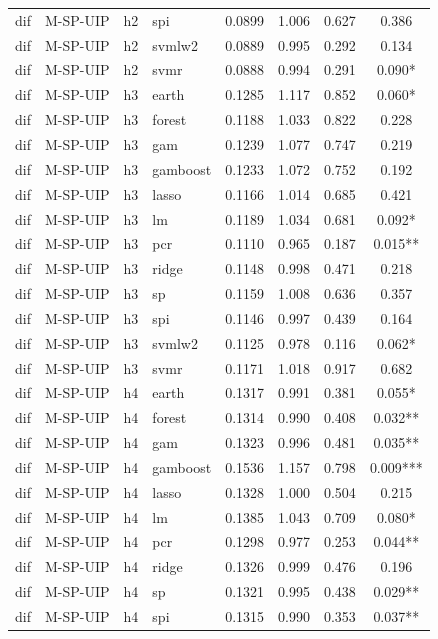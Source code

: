 \begin{ThreePartTable}
\begin{longtable}[t]{llclcccc}
dif & M-SP-UIP & h2 & spi & 0.0899 & 1.006 & 0.627 & 0.386\\
dif & M-SP-UIP & h2 & svmlw2 & 0.0889 & 0.995 & 0.292 & 0.134\\
dif & M-SP-UIP & h2 & svmr & 0.0888 & 0.994 & 0.291 & 0.090*\\
\addlinespace
dif & M-SP-UIP & h3 & earth & 0.1285 & 1.117 & 0.852 & 0.060*\\
dif & M-SP-UIP & h3 & forest & 0.1188 & 1.033 & 0.822 & 0.228\\
dif & M-SP-UIP & h3 & gam & 0.1239 & 1.077 & 0.747 & 0.219\\
dif & M-SP-UIP & h3 & gamboost & 0.1233 & 1.072 & 0.752 & 0.192\\
dif & M-SP-UIP & h3 & lasso & 0.1166 & 1.014 & 0.685 & 0.421\\
dif & M-SP-UIP & h3 & lm & 0.1189 & 1.034 & 0.681 & 0.092*\\
dif & M-SP-UIP & h3 & pcr & 0.1110 & 0.965 & 0.187 & 0.015**\\
dif & M-SP-UIP & h3 & ridge & 0.1148 & 0.998 & 0.471 & 0.218\\
dif & M-SP-UIP & h3 & sp & 0.1159 & 1.008 & 0.636 & 0.357\\
dif & M-SP-UIP & h3 & spi & 0.1146 & 0.997 & 0.439 & 0.164\\
dif & M-SP-UIP & h3 & svmlw2 & 0.1125 & 0.978 & 0.116 & 0.062*\\
dif & M-SP-UIP & h3 & svmr & 0.1171 & 1.018 & 0.917 & 0.682\\
\addlinespace
dif & M-SP-UIP & h4 & earth & 0.1317 & 0.991 & 0.381 & 0.055*\\
dif & M-SP-UIP & h4 & forest & 0.1314 & 0.990 & 0.408 & 0.032**\\
dif & M-SP-UIP & h4 & gam & 0.1323 & 0.996 & 0.481 & 0.035**\\
dif & M-SP-UIP & h4 & gamboost & 0.1536 & 1.157 & 0.798 & 0.009***\\
dif & M-SP-UIP & h4 & lasso & 0.1328 & 1.000 & 0.504 & 0.215\\
dif & M-SP-UIP & h4 & lm & 0.1385 & 1.043 & 0.709 & 0.080*\\
dif & M-SP-UIP & h4 & pcr & 0.1298 & 0.977 & 0.253 & 0.044**\\
dif & M-SP-UIP & h4 & ridge & 0.1326 & 0.999 & 0.476 & 0.196\\
dif & M-SP-UIP & h4 & sp & 0.1321 & 0.995 & 0.438 & 0.029**\\
dif & M-SP-UIP & h4 & spi & 0.1315 & 0.990 & 0.353 & 0.037**\\

\end{longtable}
\end{ThreePartTable}
